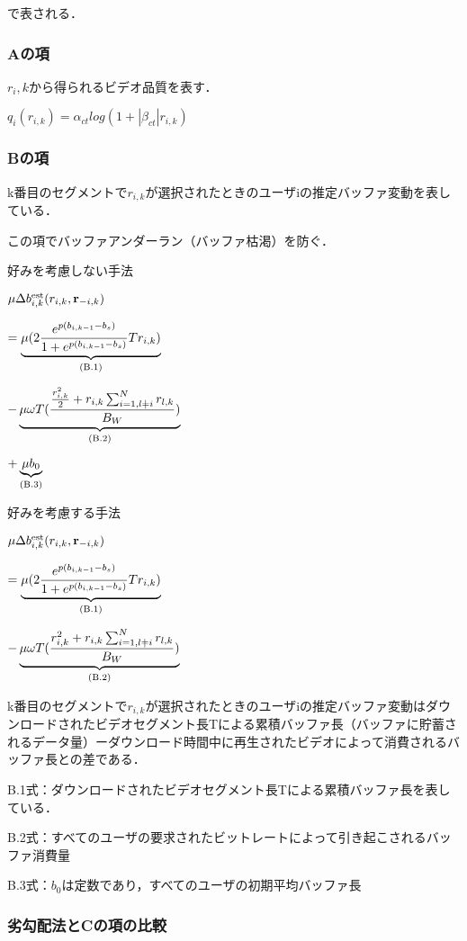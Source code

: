 \documentclass[rinkou,a4paper,uplatex]{ieicej}
\begin{document}
で表される．


\subsubsection{Aの項}
$r_i,k$から得られるビデオ品質を表す．

${q_{i}(r_{i,k})}=α_{ct}log(1+|β_{ct}|r_{i,k})$


\subsubsection{Bの項}
k番目のセグメントで$r_{i,k}$が選択されたときのユーザiの推定バッファ変動を表している．

この項でバッファアンダーラン（バッファ枯渇）を防ぐ．

好みを考慮しない手法

${\mu\Delta{b^{\rm{est}}_{i,k}}(r_{i,k},\mathbf{r}_{-i,k})}$

$=\underbrace{\mu(2\frac{e^{p(b_{i,k-1}-b_s)}}{1+e^{p(b_{i,k-1}-b_s)}}Tr_{i,k})}_{(\rm{B.1})}$

$-\underbrace{\mu\omega{T}(\frac{\frac{r_{i,k}^2}{2}+r_{i,k}\sum^{N}_{i=1,l\ne{i}}r_{l,k}}{B_W})}_{(\rm{B.2})}$

$+\underbrace{\mu{b_0}}_{(\rm{B.3})}$

好みを考慮する手法

${\mu\Delta{b^{\rm{est}}_{i,k}}(r_{i,k},\mathbf{r}_{-i,k})}$

$=\underbrace{\mu(2\frac{e^{p(b_{i,k-1}-b_s)}}{1+e^{p(b_{i,k-1}-b_s)}}Tr_{i,k})}_{(\rm{B.1})}$

$-\underbrace{\mu\omega{T}(\frac{r_{i,k}^2+r_{i,k}\sum^{N}_{i=1,l\ne{i}}r_{l,k}}{B_W})}_{(\rm{B.2})}$

k番目のセグメントで$r_{i,k}$が選択されたときのユーザiの推定バッファ変動はダウンロードされたビデオセグメント長Tによる累積バッファ長（バッファに貯蓄されるデータ量）ーダウンロード時間中に再生されたビデオによって消費されるバッファ長との差である．

B.1式：ダウンロードされたビデオセグメント長Tによる累積バッファ長を表している．

B.2式：すべてのユーザの要求されたビットレートによって引き起こされるバッファ消費量

B.3式：$b_0$は定数であり，すべてのユーザの初期平均バッファ長

\subsubsection{劣勾配法とCの項の比較}
\end{document}

